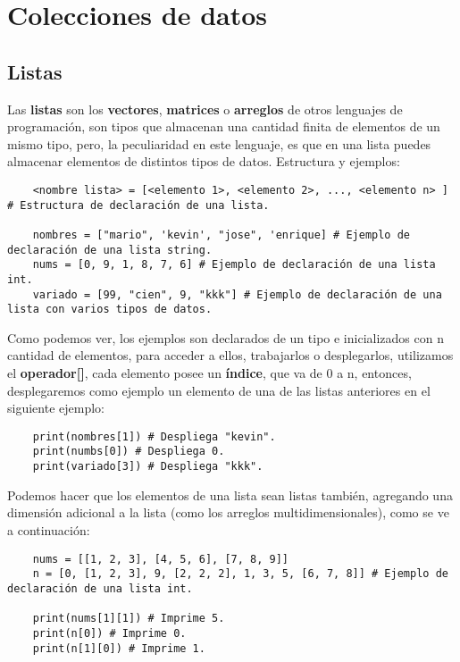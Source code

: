 \section{Colecciones de datos}


\subsection{Listas}

Las \textbf{listas} son los \textbf{vectores}, \textbf{matrices} o \textbf{arreglos} de otros lenguajes de programación, son tipos que almacenan una cantidad finita de elementos de un mismo tipo, pero, la peculiaridad en este lenguaje, es que en una lista puedes almacenar elementos de distintos tipos de datos. Estructura y ejemplos:
\begin{lstlisting}
    <nombre lista> = [<elemento 1>, <elemento 2>, ..., <elemento n> ] # Estructura de declaración de una lista.

    nombres = ["mario", 'kevin', "jose", 'enrique] # Ejemplo de declaración de una lista string.
    nums = [0, 9, 1, 8, 7, 6] # Ejemplo de declaración de una lista int.
    variado = [99, "cien", 9, "kkk"] # Ejemplo de declaración de una lista con varios tipos de datos.
\end{lstlisting}

Como podemos ver, los ejemplos son declarados de un tipo e inicializados con n cantidad de elementos, para acceder a ellos, trabajarlos o desplegarlos, utilizamos el \textbf{operador[]}, cada elemento posee un \textbf{índice}, que va de 0 a n, entonces, desplegaremos como ejemplo un elemento de una de las listas anteriores en el siguiente ejemplo:
\begin{lstlisting}
    print(nombres[1]) # Despliega "kevin".
    print(numbs[0]) # Despliega 0.
    print(variado[3]) # Despliega "kkk".
\end{lstlisting}

Podemos hacer que los elementos de una lista sean listas también, agregando una dimensión adicional a la lista (como los arreglos multidimensionales), como se ve a continuación:
\begin{lstlisting}
    nums = [[1, 2, 3], [4, 5, 6], [7, 8, 9]]
    n = [0, [1, 2, 3], 9, [2, 2, 2], 1, 3, 5, [6, 7, 8]] # Ejemplo de declaración de una lista int.
	
    print(nums[1][1]) # Imprime 5.
    print(n[0]) # Imprime 0.
    print(n[1][0]) # Imprime 1.
\end{lstlisting}

